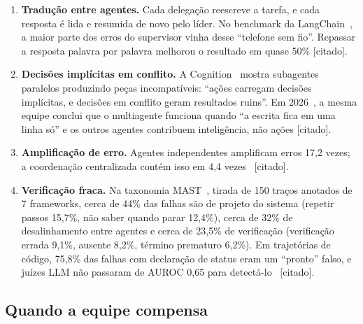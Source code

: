 \documentclass[11pt,a4paper]{article}
\newcommand{\rot}[1]{\textsf{\footnotesize[#1]}}
\begin{document}
\begin{enumerate}
  \item \textbf{Tradução entre agentes.} Cada delegação reescreve a tarefa, e cada resposta é lida e
    resumida de novo pelo líder. No benchmark da LangChain~\cite{langchain2025}, a maior parte dos
    erros do supervisor vinha desse ``telefone sem fio''. Repassar a resposta palavra por palavra
    melhorou o resultado em quase 50\% \rot{citado}.
  \item \textbf{Decisões implícitas em conflito.} A Cognition~\cite{cognition2025} mostra
    subagentes paralelos produzindo peças incompatíveis: ``ações carregam decisões implícitas, e
    decisões em conflito geram resultados ruins''. Em 2026~\cite{cognition2026}, a mesma equipe
    conclui que o multiagente funciona quando ``a escrita fica em uma linha só'' e os outros agentes
    contribuem inteligência, não ações \rot{citado}.
  \item \textbf{Amplificação de erro.} Agentes independentes amplificam erros 17,2 vezes; a
    coordenação centralizada contém isso em 4,4 vezes~\cite{kim2025} \rot{citado}.
  \item \textbf{Verificação fraca.} Na taxonomia MAST~\cite{mast2025}, tirada de 150 traços
    anotados de 7 frameworks, cerca de 44\% das falhas são de projeto do sistema (repetir passos
    15,7\%, não saber quando parar 12,4\%), cerca de 32\% de desalinhamento entre agentes e cerca de
    23,5\% de verificação (verificação errada 9,1\%, ausente 8,2\%, término prematuro 6,2\%). Em
    trajetórias de código, 75,8\% das falhas com declaração de status eram um ``pronto'' falso, e
    juízes LLM não passaram de AUROC 0,65 para detectá-lo~\cite{falsosucesso2026} \rot{citado}.
\end{enumerate}

\subsection{Quando a equipe compensa}
\end{document}
